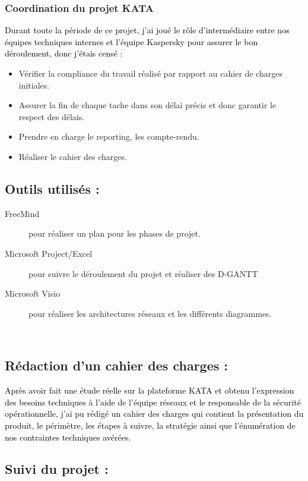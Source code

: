 \subsubsection{Coordination du projet KATA}
\textcolor{black}{Durant toute la période de ce projet, j’ai joué le rôle d’intermédiaire entre nos équipes techniques internes et l’équipe Kaspersky pour assurer le bon déroulement, donc j’étais censé : }
\begin{itemize}
	\item Vérifier la compliance du travail réalisé par rapport au cahier de charges initiales.
	\item Assurer la fin de chaque tache dans son délai précis et donc garantir le respect des délais.
	\item Prendre en charge le reporting, les compte-rendu.
	\item Réaliser le cahier des charges.
\end{itemize}

\subsection*{\textbf{Outils utilisés :}}

\begin{description}
	\item [FreeMind] pour réaliser un plan pour les phases de projet.	\item [Microsoft Project/Excel] pour suivre le déroulement du projet et réaliser des D-GANTT
	\item [Microsoft Visio] pour réaliser les architectures réseaux et les différents diagrammes.
\end{description}
~~\\
\subsection*{Rédaction d’un cahier des charges :}

\textcolor{black}{Après avoir fait une étude réelle sur la plateforme KATA et obtenu l’expression des besoins techniques à l’aide de l’équipe réseaux et le responsable de la sécurité opérationnelle, j’ai pu rédigé un cahier des charges qui contient la présentation du produit, le périmètre, les étapes à suivre, la stratégie ainsi que l’énumération de nos contraintes techniques avérées.}
~~\\
\subsection*{Suivi du projet :}

